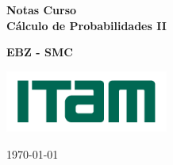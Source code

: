 
\begin{titlepage}
    \begin{center}
    	
    	\vspace*{1cm} 
   
        

    \colorbox{antiflashwhite}{
	  \parbox[t]{1.0\linewidth}{
		\centering \fontsize{30pt}{40pt}\selectfont %
		
		
		\vspace{1.5cm}
		{ \bfseries Notas Curso } \\
		\vspace{1cm}
		{ \bfseries Cálculo de Probabilidades II} \\
    \vspace*{1.5cm} 	
		
	}
}        
        
     \vspace{6cm}
     {\bfseries EBZ - SMC} \\
		  \vspace{1cm}
	
	
	   {\centering \large 
      \medskip
      \includegraphics[width = 0.4\textwidth]{logos/itam.png} \\
      }
    
     
     
     \vspace{1cm}
     
     {\centering \LARGE 
     \today \\
     }

    \vfill
        
    \end{center}
\end{titlepage}

\tableofcontents

\vspace{1cm}